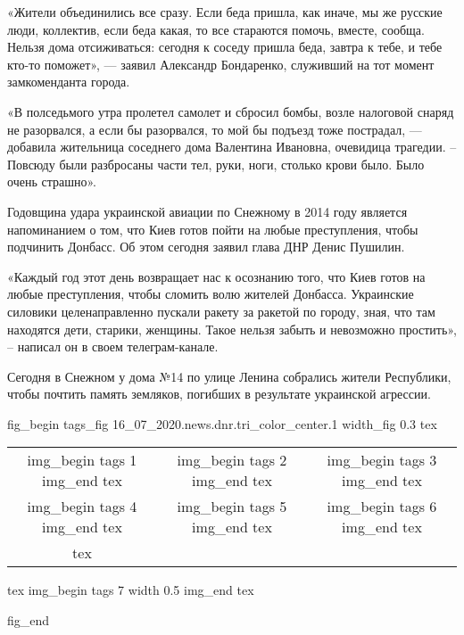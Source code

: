 «Жители объединились все сразу. Если беда пришла, как иначе, мы же русские
люди, коллектив, если беда какая, то все стараются помочь, вместе, сообща.
Нельзя дома отсиживаться: сегодня к соседу пришла беда, завтра к тебе, и тебе
кто-то поможет», — заявил Александр Бондаренко, служивший на тот момент
замкоменданта города.

«В полседьмого утра пролетел самолет и сбросил бомбы, возле налоговой снаряд не
разорвался, а если бы разорвался, то мой бы подъезд тоже пострадал, — добавила
жительница соседнего дома Валентина Ивановна, очевидица трагедии. – Повсюду
были разбросаны части тел, руки, ноги, столько крови было. Было очень страшно».

Годовщина удара украинской авиации по Снежному в 2014 году является
напоминанием о том, что Киев готов пойти на любые преступления, чтобы подчинить
Донбасс. Об этом сегодня заявил глава ДНР Денис Пушилин.

«Каждый год этот день возвращает нас к осознанию того, что Киев готов на любые
преступления, чтобы сломить волю жителей Донбасса. Украинские силовики
целенаправленно пускали ракету за ракетой по городу, зная, что там находятся
дети, старики, женщины. Такое нельзя забыть и невозможно простить», – написал
он в своем телеграм-канале.

Сегодня в Снежном у дома №14 по улице Ленина собрались жители Республики, чтобы
почтить память земляков, погибших в результате украинской агрессии.

\ifcmt
fig_begin
	tags_fig 16_07_2020.news.dnr.tri_color_center.1
	width_fig 0.3
	tex \begin{tabular}{ccc}
	img_begin 
		tags 1
	img_end
	tex &
	img_begin 
		tags 2
	img_end
	tex &
	img_begin 
		tags 3
	img_end
	tex \\
	img_begin 
		tags 4
	img_end
	tex &
	img_begin 
		tags 5
	img_end
	tex &
	img_begin 
		tags 6
	img_end
	tex \\
	tex \end{tabular}
	tex \centering
	img_begin 
		tags 7
		width 0.5
	img_end
	tex \caption{\sectitle}
fig_end
\fi

  
